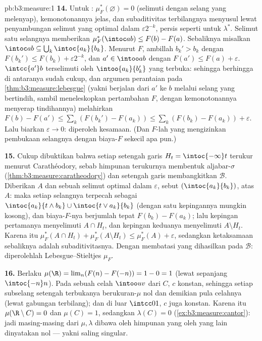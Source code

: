 \begin{solution}{pb:b3:measure:1}
\textbf{14.} Untuk : $\mu_F^*(\varnothing) = 0$ (selimuti
dengan selang yang melenyap), kemonotonannya jelas, dan subaditivitas
terbilangnya menyusul lewat penyambungan selimut yang optimal dalam
$\varepsilon2^{-k}$, persis seperti untuk $\lambda^*$. Selimut satu selangnya
memberikan $\mu_F^*(\intoc ab) \leq F(b) - F(a)$. Sebaliknya misalkan
$\intoc ab \subseteq \bigcup_k\intoc{a_k}{b_k}$. Menurut 
$F$, ambillah $b_k' > b_k$ dengan $F(b_k') \leq F(b_k) +
\varepsilon2^{-k}$, dan $a' \in \intoo ab$ dengan $F(a') \leq
F(a) + \varepsilon$.  $\intcc{a'}b$ terselimuti oleh
$\intoo{a_k}{b_k'}$ yang terbuka: sehingga berhingga di antaranya sudah cukup, dan
argumen perantaian pada \cref{thm:b3:measure:lebesgue} (yakni berjalan dari
$a'$ ke $b$ melalui selang yang bertindih, sambil meneleskopkan
pertambahan $F$, dengan kemonotonannya menyerap tindihannya) melahirkan $F(b)
- F(a') \leq \sum_k(F(b_k') - F(a_k)) \leq \sum_k(F(b_k) -
F(a_k)) + \varepsilon$. Lalu biarkan $\varepsilon \to 0$: diperoleh kesamaan.
(Dan  $F$-lah yang mengizinkan pembukaan selangnya dengan
biaya-$F$ sekecil apa pun.)

\textbf{15.} Cukup dibuktikan bahwa setiap setengah garis $H_t =
\intoc{-\infty}t$ terukur menurut Carathéodory, sebab
himpunan terukurnya membentuk aljabar-$\sigma$
(\cref{thm:b3:measure:caratheodory}) dan setengah garis membangkitkan
$\mathcal B$. Diberikan $A$ dan sebuah selimut optimal dalam $\varepsilon$,
sebut $(\intoc{a_k}{b_k})$, atas $A$: maka setiap selangnya terpecah sebagai
$\intoc{a_k}{t\wedge b_k} \cup \intoc{t \vee a_k}{b_k}$ (dengan satu
kepingannya mungkin kosong), dan biaya-$F$-nya berjumlah tepat
$F(b_k) - F(a_k)$; lalu kepingan pertamanya menyelimuti $A \cap H_t$, dan
kepingan keduanya menyelimuti $A \setminus H_t$. Karena itu $\mu_F^*(A\cap H_t) +
\mu_F^*(A\setminus H_t) \leq \mu_F^*(A) + \varepsilon$, sedangkan
ketaksamaan sebaliknya adalah subaditivitasnya. Dengan membatasi
 yang dihasilkan pada $\mathcal B$: diperolehlah 
Lebesgue--Stieltjes $\mu_F$.

\textbf{16.} Berlaku $\mu(\R) = \lim_n(F(n) - F(-n)) = 1 - 0 = 1$
(lewat   sepanjang $\intoc{-n}n$). Pada sebuah celah
$\intoo uv$ dari $C$, $c$ konstan, sehingga setiap subselang setengah
terbukanya berukuran-$\mu$ nol dan demikian pula celahnya (lewat gabungan
terbilang); dan di luar $\intcc01$, $c$ juga konstan. Karena itu
$\mu(\R\setminus C) = 0$ dan $\mu(C) = 1$, sedangkan $\lambda(C) =
0$ (\cref{ex:b3:measure:cantor}): jadi masing-masing dari $\mu, \lambda$
dibawa oleh himpunan yang oleh yang lain dinyatakan nol --- yakni saling
singular.


\end{solution}
